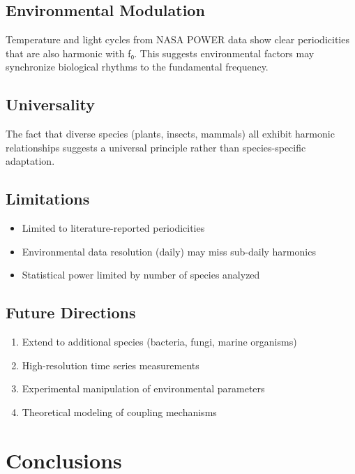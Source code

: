 \documentclass[11pt,a4paper]{article}
\begin{document}
\subsection{Environmental Modulation}

Temperature and light cycles from NASA POWER data show clear periodicities that are also harmonic with f₀. This suggests environmental factors may synchronize biological rhythms to the fundamental frequency.

\subsection{Universality}

The fact that diverse species (plants, insects, mammals) all exhibit harmonic relationships suggests a universal principle rather than species-specific adaptation.

\subsection{Limitations}

\begin{itemize}
    \item Limited to literature-reported periodicities
    \item Environmental data resolution (daily) may miss sub-daily harmonics
    \item Statistical power limited by number of species analyzed
\end{itemize}

\subsection{Future Directions}

\begin{enumerate}
    \item Extend to additional species (bacteria, fungi, marine organisms)
    \item High-resolution time series measurements
    \item Experimental manipulation of environmental parameters
    \item Theoretical modeling of coupling mechanisms
\end{enumerate}

\section{Conclusions}
\end{document}

